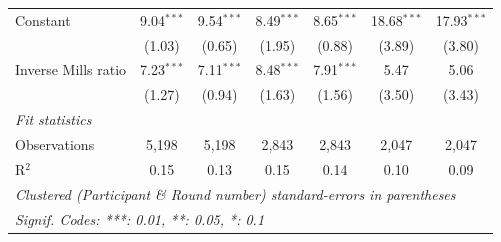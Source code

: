 \begin{tabular}{lcccccc}
   Constant                          & 9.04$^{***}$ & 9.54$^{***}$ & 8.49$^{***}$ & 8.65$^{***}$ & 18.68$^{***}$ & 17.93$^{***}$\\   
                                     & (1.03)       & (0.65)       & (1.95)       & (0.88)       & (3.89)        & (3.80)\\   
   Inverse Mills ratio               & 7.23$^{***}$ & 7.11$^{***}$ & 8.48$^{***}$ & 7.91$^{***}$ & 5.47          & 5.06\\   
                                     & (1.27)       & (0.94)       & (1.63)       & (1.56)       & (3.50)        & (3.43)\\   
   \midrule
   \emph{Fit statistics}\\
   Observations                      & 5,198        & 5,198        & 2,843        & 2,843        & 2,047         & 2,047\\  
   R$^2$                             & 0.15         & 0.13         & 0.15         & 0.14         & 0.10          & 0.09\\  
   \midrule \midrule
   \multicolumn{7}{l}{\emph{Clustered (Participant \& Round number) standard-errors in parentheses}}\\
   \multicolumn{7}{l}{\emph{Signif. Codes: ***: 0.01, **: 0.05, *: 0.1}}\\
\end{tabular}
\par\endgroup
